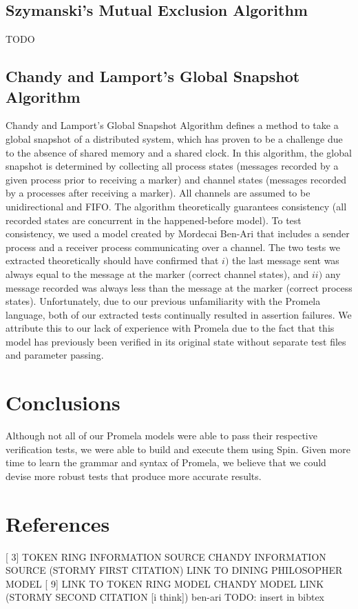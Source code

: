 \documentclass[12pt]{article}
\begin{document}
\begin{flushleft}
\subsection{Szymanski's Mutual Exclusion Algorithm}
TODO

\subsection{Chandy and Lamport's Global Snapshot Algorithm}
Chandy and Lamport's Global Snapshot Algorithm defines a method to take a global
snapshot of a distributed system, which has proven to be a challenge due to the
absence of shared memory and a shared clock. In this algorithm, the global
snapshot is determined by collecting all process states (messages recorded by a
given process prior to receiving a marker) and channel states (messages recorded
by a processes after receiving a marker). All channels are assumed to be
unidirectional and FIFO. The algorithm theoretically guarantees consistency (all
recorded states are concurrent in the happened-before model). To test
consistency, we used a model created by Mordecai Ben-Ari \cite{ben-ari} that includes a
sender process and a receiver process communicating over a channel. The two
tests we extracted theoretically should have confirmed that $i)$ the last
message sent was always equal to the message at the marker (correct channel
states), and $ii)$ any message recorded was always less than the message at the
marker (correct process states). Unfortunately, due to our previous
unfamiliarity with the Promela language, both of our extracted tests continually
resulted in assertion failures. We attribute this to our lack of experience with
Promela due to the fact that this model has previously been verified in its
original state without separate test files and parameter passing.

\section{Conclusions}
Although not all of our Promela models were able to pass their respective
verification tests, we were able to build and execute them using Spin. Given
more time to learn the grammar and syntax of Promela, we believe that we could
devise more robust tests that produce more accurate results.

\section{References}
[ 3] TOKEN RING INFORMATION SOURCE \newline
[ 5] CHANDY INFORMATION SOURCE (STORMY FIRST CITATION) \newline
[ 8] LINK TO DINING PHILOSOPHER MODEL
[ 9] LINK TO TOKEN RING MODEL \newline
[11] CHANDY MODEL LINK (STORMY SECOND CITATION [i think])    ben-ari TODO:
insert in bibtex
\end{flushleft}
\end{document}
